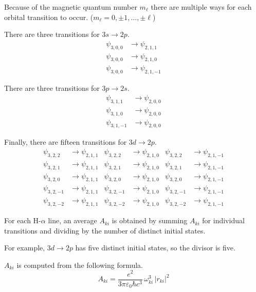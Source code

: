 \documentclass[12pt]{article}
\begin{document}
\noindent
Because of the magnetic quantum number $m_\ell$
there are multiple ways for each orbital transition to occur.
($m_\ell=0,\pm1,\ldots,\pm\ell$)

\bigskip
\noindent
There are three transitions for $3s\rightarrow2p$.
\begin{align*}
\psi_{3,0,0}&\rightarrow\psi_{2,1,1}
\\
\psi_{3,0,0}&\rightarrow\psi_{2,1,0}
\\
\psi_{3,0,0}&\rightarrow\psi_{2,1,-1}
\end{align*}

\noindent
There are three transitions for $3p\rightarrow2s$.
\begin{align*}
\psi_{3,1,1}&\rightarrow\psi_{2,0,0}
\\
\psi_{3,1,0}&\rightarrow\psi_{2,0,0}
\\
\psi_{3,1,-1}&\rightarrow\psi_{2,0,0}
\end{align*}

\noindent
Finally, there are fifteen transitions for $3d\rightarrow2p$.
\begin{align*}
\psi_{3,2,2}&\rightarrow\psi_{2,1,1} &
\psi_{3,2,2}&\rightarrow\psi_{2,1,0} &
\psi_{3,2,2}&\rightarrow\psi_{2,1,-1}
\\
\psi_{3,2,1}&\rightarrow\psi_{2,1,1} &
\psi_{3,2,1}&\rightarrow\psi_{2,1,0} &
\psi_{3,2,1}&\rightarrow\psi_{2,1,-1}
\\
\psi_{3,2,0}&\rightarrow\psi_{2,1,1} &
\psi_{3,2,0}&\rightarrow\psi_{2,1,0} &
\psi_{3,2,0}&\rightarrow\psi_{2,1,-1}
\\
\psi_{3,2,-1}&\rightarrow\psi_{2,1,1} &
\psi_{3,2,-1}&\rightarrow\psi_{2,1,0} &
\psi_{3,2,-1}&\rightarrow\psi_{2,1,-1}
\\
\psi_{3,2,-2}&\rightarrow\psi_{2,1,1} &
\psi_{3,2,-2}&\rightarrow\psi_{2,1,0} &
\psi_{3,2,-2}&\rightarrow\psi_{2,1,-1}
\end{align*}

\noindent
For each H-$\alpha$ line, an average $A_{ki}$ is obtained by summing $A_{ki}$ for individual transitions
and dividing by the number of distinct initial states.

\bigskip
\noindent
For example, $3d\rightarrow2p$ has five distinct initial states, so the divisor is five.

\bigskip
\noindent
$A_{ki}$ is computed from the following formula.
\begin{equation*}
A_{ki}=\frac{e^2}{3\pi\varepsilon_0\hbar c^3}\,\omega_{ki}^3\,|r_{ki}|^2
\end{equation*}
\end{document}
